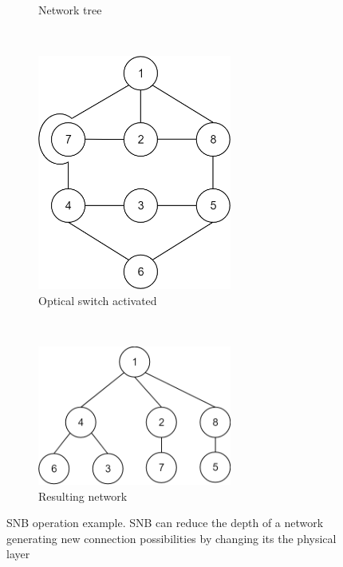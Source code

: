 \documentclass[conference]{IEEEtran}
\begin{document}
\begin{figure}[t!]
\begin{subfigure}[t]{0.2\textwidth}
	\caption{Network tree}
	\label{BSN-example-network-tree}
	\end{subfigure}
	~
	\begin{subfigure}[t]{0.2\textwidth}
		\centering
		\includegraphics[width=0.7\textwidth]{./figuras/BSN-ex-bypass.png} %
	\caption{Optical switch activated}
	\label{BSN-example-opt-switch}
	\end{subfigure}
	~
	\begin{subfigure}[t]{0.2\textwidth}
		\centering
		\includegraphics[width=0.7\textwidth]{./figuras/BSN-ex-network-final.png} %
	\caption{Resulting network}
	\label{BSN-example-rede-otimizada}
	\end{subfigure}
	\caption{SNB operation example. SNB can reduce the depth of a network generating new connection possibilities by changing its the physical layer}
	\label{fig-bsn-exemplo}
\end{figure}
\end{document}
